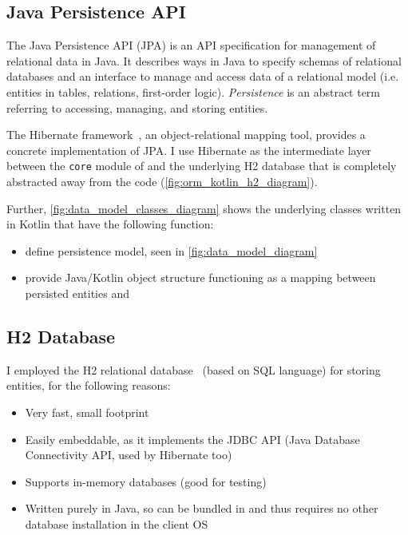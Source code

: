 \subsection{Java Persistence API}

The Java Persistence API\cite{BiswasJavaPersistenceAPI2016} (JPA) is an API specification for management of relational data in Java.
It describes ways in Java to specify schemas of relational databases and an interface to manage and access data of a relational model (i.e. entities in tables, relations, first-order logic).
\textsl{Persistence} is an abstract term referring to accessing, managing, and storing entities.

The Hibernate framework~\cite{ElliottHibernateDeveloperNotebook2004,BauerJavaPersistenceHibernate2015}, an object-relational mapping tool, provides a concrete implementation of JPA.
I use Hibernate as the intermediate layer between the \texttt{core} module of \graffs and the underlying H2 database that is completely abstracted away from the \graffs code (\autoref{fig:orm_kotlin_h2_diagram}).





Further, \autoref{fig:data_model_classes_diagram} shows the underlying classes written in Kotlin that have the following function:
\begin{itemize}[topsep=5pt]
    \item define persistence model, seen in \autoref{fig:data_model_diagram}
    \item provide Java/Kotlin object structure functioning as a mapping between persisted entities and
\end{itemize}


\subsection{H2 Database}

I employed the H2 relational database~\cite{MuellerH2DatabaseEngine2006} (based on SQL language) for storing entities, for the following reasons:
\begin{itemize}[topsep=5pt]
    \item Very fast, small footprint
    \item Easily embeddable, as it implements the JDBC API (Java Database Connectivity API, used by Hibernate too)
    \item Supports in-memory databases (good for testing)
    \item Written purely in Java, so can be bundled in \graffs and thus requires no other database installation in the client OS
\end{itemize}

